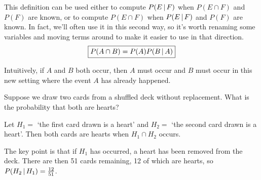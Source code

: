 This definition can be used either to compute $P(E \,|\, F)$ when $P(E \cap F)$ and $P(F)$ are known, or to compute $P(E \cap F)$ when $P(E \,|\, F)$ and $P(F)$ are known. In fact, we'll often use it in this second way, so it's worth renaming some variables and moving terms around to make it easier to use in that direction.
$$\boxed{P(A \cap B) = P(A) P(B \,|\, A)}$$
\par
Intuitively, if $A$ and $B$ both occur, then $A$ must occur and $B$ must occur in this new setting where the event $A$ has already happened.
\begin{examp}
Suppose we draw two cards from a shuffled deck without replacement. What is the probability that both are hearts? 
\par
\noindent Let $H_1 =$ `the first card drawn is a heart' and $H_2 =$ `the second card drawn is a heart'. Then both cards are hearts when $H_1 \cap H_2$ occurs.
\par
\noindent The key point is that if $H_1$ has occurred, a heart has been removed from the deck. There are then 51 cards remaining, 12 of which are hearts, so $P(H_2 \,|\, H_1) = \frac{12}{51}$.
\end{examp}
